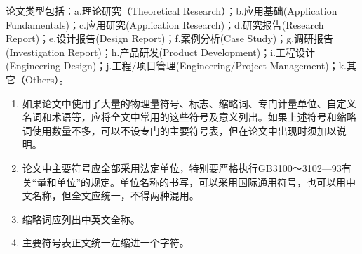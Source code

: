 \begin{tcolorbox}[colback=blue!5!white,colframe=blue!75!black,title=论文类型要求]
  论文类型包括：a.理论研究（Theoretical Research）；b.应用基础(Application Fundamentals)；c.应用研究(Application Research)；d.研究报告(Research Report)；e.设计报告(Design Report)；f.案例分析(Case Study)；g.调研报告(Investigation Report)；h.产品研发(Product Development)；i.工程设计(Engineering Design)；j.工程/项目管理(Engineering/Project Management)；k.其它（Others）。
\end{tcolorbox}


\begin{tcolorbox}[colback=red!5!white,colframe=red!75!black]
  \begin{enumerate}[leftmargin=0.5cm]
    \item 如果论文中使用了大量的物理量符号、标志、缩略词、专门计量单位、自定义名词和术语等，应将全文中常用的这些符号及意义列出。如果上述符号和缩略词使用数量不多，可以不设专门的主要符号表，但在论文中出现时须加以说明。
    \item 论文中主要符号应全部采用法定单位，特别要严格执行GB3100～3102—93有关“量和单位”的规定。单位名称的书写，可以采用国际通用符号，也可以用中文名称，但全文应统一，不得两种混用。
    \item 缩略词应列出中英文全称。
    \item 主要符号表正文统一左缩进一个字符。
  \end{enumerate}
\end{tcolorbox}



